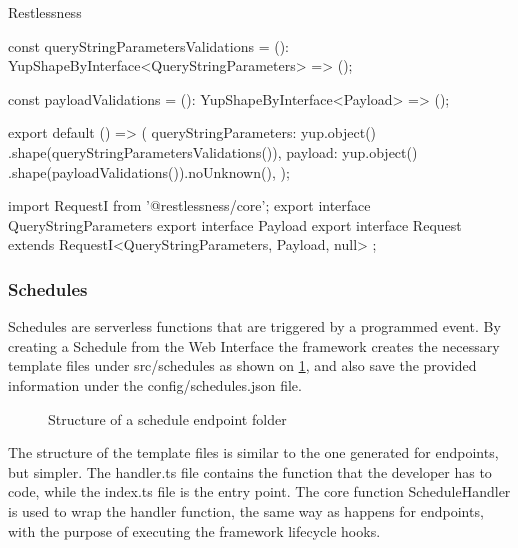 \begin{chapter}{Restlessness}
    \bigskip
    \begin{code}[caption=validations.ts content, label={lst:validations_ts}]
const queryStringParametersValidations =
  (): YupShapeByInterface<QueryStringParameters>  => ({});

const payloadValidations =
  (): YupShapeByInterface<Payload> => ({});

export default () => ({
  queryStringParameters: yup.object()
    .shape(queryStringParametersValidations()),
  payload: yup.object()
    .shape(payloadValidations()).noUnknown(),
});
    \end{code}

    \bigskip
    \begin{code}[caption=interfaces.ts content, label={lst:interfaces_ts}]
import { RequestI } from '@restlessness/core';
export interface QueryStringParameters {}
export interface Payload {}
export interface Request extends
    RequestI<QueryStringParameters, Payload, null> {};
    \end{code}

    \subsubsection{Schedules}
    \label{subsec:schedules}
    Schedules are serverless functions that are triggered by a programmed event.
    By creating a Schedule from the Web Interface the framework creates the necessary
    template files under src/schedules as shown on \ref{fig:new_schedule_folder_structure},
    and also save the provided information under the config/schedules.json file.

    \begin{figure}
        \begin{minipage}{\linewidth}
        \end{minipage}
        \caption{Structure of a schedule endpoint folder}
        \label{fig:new_schedule_folder_structure}
    \end{figure}

    The structure of the template files is similar to the one generated for endpoints,
    but simpler. The handler.ts file contains the function that the developer has
    to code, while the index.ts file is the entry point.
    The core function ScheduleHandler is used to wrap the handler function, the same
    way as happens for endpoints, with the purpose of executing the framework lifecycle
    hooks.


\end{chapter}
